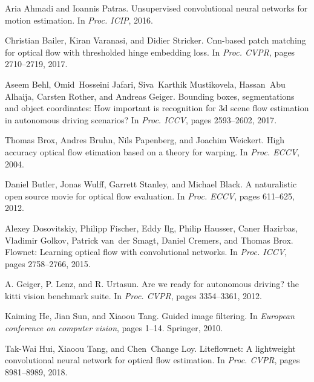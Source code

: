 \documentclass[final]{cvpr}
\begin{document}
	
	
\begin{thebibliography}{10}\itemsep=-1pt
	
	Aria Ahmadi and Ioannis Patras.
	\newblock Unsupervised convolutional neural networks for motion estimation.
	\newblock In {\em {Proc. ICIP}}, 2016.
	
	Christian Bailer, Kiran Varanasi, and Didier Stricker.
	\newblock Cnn-based patch matching for optical flow with thresholded hinge
	embedding loss.
	\newblock In {\em {Proc. CVPR}}, pages 2710--2719, 2017.
	
	Aseem Behl, Omid~Hosseini Jafari, Siva~Karthik Mustikovela, Hassan~Abu Alhaija,
	Carsten Rother, and Andreas Geiger.
	\newblock Bounding boxes, segmentations and object coordinates: How important
	is recognition for 3d scene flow estimation in autonomous driving scenarios?
	\newblock In {\em {Proc. ICCV}}, pages 2593--2602, 2017.
	
	Thomas Brox, Andres Bruhn, Nils Papenberg, and Joachim Weickert.
	\newblock High accuracy optical flow etimation based on a theory for warping.
	\newblock In {\em {Proc. ECCV}}, 2004.
	
	Daniel Butler, Jonas Wulff, Garrett Stanley, and Michael Black.
	\newblock A naturalistic open source movie for optical flow evaluation.
	\newblock In {\em {Proc. ECCV}}, pages 611--625, 2012.
	
	Alexey Dosovitskiy, Philipp Fischer, Eddy Ilg, Philip Hausser, Caner Hazirbas,
	Vladimir Golkov, Patrick van~der Smagt, Daniel Cremers, and Thomas Brox.
	\newblock Flownet: Learning optical flow with convolutional networks.
	\newblock In {\em {Proc. ICCV}}, pages 2758--2766, 2015.
	
	A. Geiger, P. Lenz, and R. Urtasun.
	\newblock Are we ready for autonomous driving? the kitti vision benchmark
	suite.
	\newblock In {\em {Proc. CVPR}}, pages 3354--3361, 2012.
	
	Kaiming He, Jian Sun, and Xiaoou Tang.
	\newblock Guided image filtering.
	\newblock In {\em European conference on computer vision}, pages 1--14.
	Springer, 2010.
	
	Tak-Wai Hui, Xiaoou Tang, and Chen~Change Loy.
	\newblock Liteflownet: A lightweight convolutional neural network for optical
	flow estimation.
	\newblock In {\em {Proc. CVPR}}, pages 8981--8989, 2018.
	

\end{thebibliography}
\end{document}
